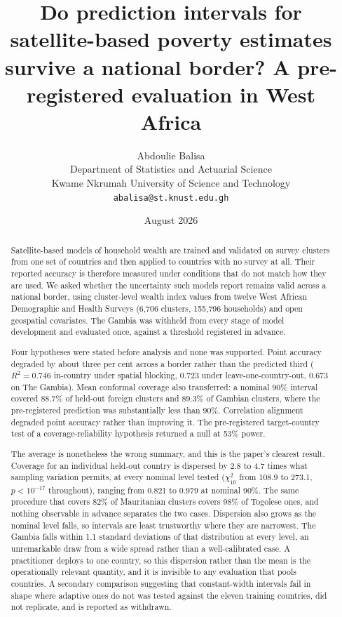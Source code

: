 \documentclass[11pt]{article}
\title{Do prediction intervals for satellite-based poverty estimates
survive a national border? A pre-registered evaluation in West Africa}
\author{Abdoulie Balisa\\
Department of Statistics and Actuarial Science\\
Kwame Nkrumah University of Science and Technology\\
\texttt{abalisa@st.knust.edu.gh}}
\date{August 2026}
\begin{document}
\maketitle

\begin{abstract}
Satellite-based models of household wealth are trained and validated on survey
clusters from one set of countries and then applied to countries with no survey
at all. Their reported accuracy is therefore measured under conditions that do
not match how they are used. We asked whether the uncertainty such models report
remains valid across a national border, using cluster-level wealth index values
from twelve West African Demographic and Health Surveys (6{,}706 clusters,
155{,}796 households) and open geospatial covariates. The Gambia was withheld
from every stage of model development and evaluated once, against a threshold
registered in advance.

Four hypotheses were stated before analysis and none was supported. Point
accuracy degraded by about three per cent across a border rather than the
predicted third ($R^2 = 0.746$ in-country under spatial blocking, $0.723$ under
leave-one-country-out, $0.673$ on The Gambia). Mean conformal coverage also
transferred: a nominal 90\% interval covered 88.7\% of held-out foreign clusters
and 89.3\% of Gambian clusters, where the pre-registered prediction was
substantially less than 90\%. Correlation alignment degraded point accuracy
rather than improving it. The pre-registered target-country test of a
coverage-reliability hypothesis returned a null at 53\% power.

The average is nonetheless the wrong summary, and this is the paper's clearest
result. Coverage for an individual held-out country is dispersed by 2.8 to 4.7
times what sampling variation permits, at every nominal level tested
($\chi^2_{10}$ from 108.9 to 273.1, $p < 10^{-17}$ throughout), ranging from
0.821 to 0.979 at nominal 90\%. The same procedure that covers 82\% of
Mauritanian clusters covers 98\% of Togolese ones, and nothing observable in
advance separates the two cases. Dispersion also grows as the nominal level
falls, so intervals are least trustworthy where they are narrowest. The Gambia
falls within 1.1 standard deviations of that distribution at every level, an
unremarkable draw from a wide spread rather than a well-calibrated case. A
practitioner deploys to one country, so this dispersion rather than the mean is
the operationally relevant quantity, and it is invisible to any evaluation that
pools countries. A secondary comparison suggesting that constant-width intervals
fail in shape where adaptive ones do not was tested against the eleven training
countries, did not replicate, and is reported as withdrawn.
\end{abstract}
\end{document}

